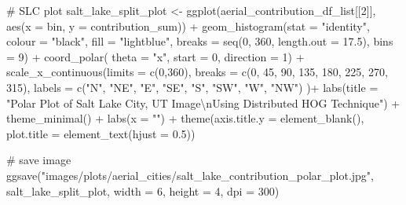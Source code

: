 \documentclass[
  letterpaper,
  DIV=11,
  numbers=noendperiod]{scrreprt}
\newenvironment{Shaded}{\begin{snugshade}}{\end{snugshade}}
\newcommand{\AttributeTok}[1]{\textcolor[rgb]{0.40,0.45,0.13}{#1}}
\newcommand{\CommentTok}[1]{\textcolor[rgb]{0.37,0.37,0.37}{#1}}
\newcommand{\DecValTok}[1]{\textcolor[rgb]{0.68,0.00,0.00}{#1}}
\newcommand{\FloatTok}[1]{\textcolor[rgb]{0.68,0.00,0.00}{#1}}
\newcommand{\FunctionTok}[1]{\textcolor[rgb]{0.28,0.35,0.67}{#1}}
\newcommand{\NormalTok}[1]{\textcolor[rgb]{0.00,0.23,0.31}{#1}}
\newcommand{\OtherTok}[1]{\textcolor[rgb]{0.00,0.23,0.31}{#1}}
\newcommand{\SpecialCharTok}[1]{\textcolor[rgb]{0.37,0.37,0.37}{#1}}
\newcommand{\StringTok}[1]{\textcolor[rgb]{0.13,0.47,0.30}{#1}}
\begin{document}
\begin{Shaded}
\begin{Highlighting}[]
\CommentTok{\# SLC plot}
\NormalTok{salt\_lake\_split\_plot }\OtherTok{\textless{}{-}}
  \FunctionTok{ggplot}\NormalTok{(aerial\_contribution\_df\_list[[}\DecValTok{2}\NormalTok{]], }
         \FunctionTok{aes}\NormalTok{(}\AttributeTok{x =}\NormalTok{ bin, }\AttributeTok{y =}\NormalTok{ contribution\_sum)) }\SpecialCharTok{+}
  \FunctionTok{geom\_histogram}\NormalTok{(}\AttributeTok{stat =} \StringTok{"identity"}\NormalTok{,}
                 \AttributeTok{colour =} \StringTok{"black"}\NormalTok{, }
                 \AttributeTok{fill =} \StringTok{"lightblue"}\NormalTok{, }
                 \AttributeTok{breaks =} \FunctionTok{seq}\NormalTok{(}\DecValTok{0}\NormalTok{, }\DecValTok{360}\NormalTok{, }\AttributeTok{length.out =} \FloatTok{17.5}\NormalTok{),}
                 \AttributeTok{bins =} \DecValTok{9}\NormalTok{) }\SpecialCharTok{+}
  \FunctionTok{coord\_polar}\NormalTok{(}
    \AttributeTok{theta =} \StringTok{"x"}\NormalTok{, }
    \AttributeTok{start =} \DecValTok{0}\NormalTok{, }
    \AttributeTok{direction =} \DecValTok{1}\NormalTok{) }\SpecialCharTok{+}
  \FunctionTok{scale\_x\_continuous}\NormalTok{(}\AttributeTok{limits =} \FunctionTok{c}\NormalTok{(}\DecValTok{0}\NormalTok{,}\DecValTok{360}\NormalTok{),}
    \AttributeTok{breaks =} \FunctionTok{c}\NormalTok{(}\DecValTok{0}\NormalTok{, }\DecValTok{45}\NormalTok{, }\DecValTok{90}\NormalTok{, }\DecValTok{135}\NormalTok{, }\DecValTok{180}\NormalTok{, }\DecValTok{225}\NormalTok{, }\DecValTok{270}\NormalTok{, }\DecValTok{315}\NormalTok{), }
    \AttributeTok{labels =} \FunctionTok{c}\NormalTok{(}\StringTok{"N"}\NormalTok{, }\StringTok{"NE"}\NormalTok{, }\StringTok{"E"}\NormalTok{, }\StringTok{"SE"}\NormalTok{, }\StringTok{"S"}\NormalTok{, }\StringTok{"SW"}\NormalTok{, }\StringTok{"W"}\NormalTok{, }\StringTok{"NW"}\NormalTok{)}
\NormalTok{  )}\SpecialCharTok{+}
  \FunctionTok{labs}\NormalTok{(}\AttributeTok{title =} \StringTok{"Polar Plot of Salt Lake City, UT Image}\SpecialCharTok{\textbackslash{}n}\StringTok{Using Distributed HOG Technique"}\NormalTok{) }\SpecialCharTok{+}
  \FunctionTok{theme\_minimal}\NormalTok{() }\SpecialCharTok{+}
  \FunctionTok{labs}\NormalTok{(}\AttributeTok{x =} \StringTok{""}\NormalTok{) }\SpecialCharTok{+}
  \FunctionTok{theme}\NormalTok{(}\AttributeTok{axis.title.y =} \FunctionTok{element\_blank}\NormalTok{(),}
        \AttributeTok{plot.title =} \FunctionTok{element\_text}\NormalTok{(}\AttributeTok{hjust =} \FloatTok{0.5}\NormalTok{))}

\CommentTok{\# save image}
\FunctionTok{ggsave}\NormalTok{(}\StringTok{"images/plots/aerial\_cities/salt\_lake\_contribution\_polar\_plot.jpg"}\NormalTok{, salt\_lake\_split\_plot, }\AttributeTok{width =} \DecValTok{6}\NormalTok{, }\AttributeTok{height =} \DecValTok{4}\NormalTok{, }\AttributeTok{dpi =} \DecValTok{300}\NormalTok{)}
\end{Highlighting}
\end{Shaded}
\end{document}
